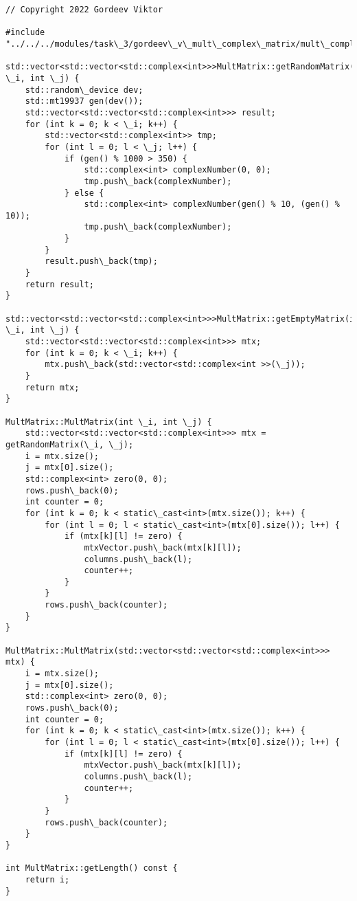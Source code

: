\documentclass{report}
\begin{document}
\begin{lstlisting}
// Copyright 2022 Gordeev Viktor

#include "../../../modules/task\_3/gordeev\_v\_mult\_complex\_matrix/mult\_complex\_matrix.h"

std::vector<std::vector<std::complex<int>>>MultMatrix::getRandomMatrix(int \_i, int \_j) {
    std::random\_device dev;
    std::mt19937 gen(dev());
    std::vector<std::vector<std::complex<int>>> result;
    for (int k = 0; k < \_i; k++) {
        std::vector<std::complex<int>> tmp;
        for (int l = 0; l < \_j; l++) {
            if (gen() % 1000 > 350) {
                std::complex<int> complexNumber(0, 0);
                tmp.push\_back(complexNumber);
            } else {
                std::complex<int> complexNumber(gen() % 10, (gen() % 10));
                tmp.push\_back(complexNumber);
            }
        }
        result.push\_back(tmp);
    }
    return result;
}

std::vector<std::vector<std::complex<int>>>MultMatrix::getEmptyMatrix(int \_i, int \_j) {
    std::vector<std::vector<std::complex<int>>> mtx;
    for (int k = 0; k < \_i; k++) {
        mtx.push\_back(std::vector<std::complex<int >>(\_j));
    }
    return mtx;
}

MultMatrix::MultMatrix(int \_i, int \_j) {
    std::vector<std::vector<std::complex<int>>> mtx = getRandomMatrix(\_i, \_j);
    i = mtx.size();
    j = mtx[0].size();
    std::complex<int> zero(0, 0);
    rows.push\_back(0);
    int counter = 0;
    for (int k = 0; k < static\_cast<int>(mtx.size()); k++) {
        for (int l = 0; l < static\_cast<int>(mtx[0].size()); l++) {
            if (mtx[k][l] != zero) {
                mtxVector.push\_back(mtx[k][l]);
                columns.push\_back(l);
                counter++;
            }
        }
        rows.push\_back(counter);
    }
}

MultMatrix::MultMatrix(std::vector<std::vector<std::complex<int>>> mtx) {
    i = mtx.size();
    j = mtx[0].size();
    std::complex<int> zero(0, 0);
    rows.push\_back(0);
    int counter = 0;
    for (int k = 0; k < static\_cast<int>(mtx.size()); k++) {
        for (int l = 0; l < static\_cast<int>(mtx[0].size()); l++) {
            if (mtx[k][l] != zero) {
                mtxVector.push\_back(mtx[k][l]);
                columns.push\_back(l);
                counter++;
            }
        }
        rows.push\_back(counter);
    }
}

int MultMatrix::getLength() const {
    return i;
}


\end{lstlisting}
\end{document}
